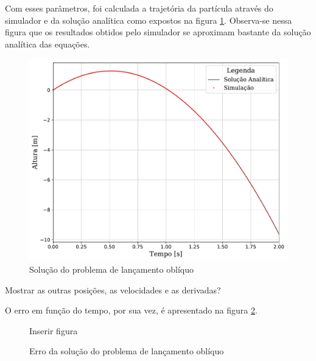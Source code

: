 Com esses parâmetros, foi calculada a trajetória da partícula através do simulador e da solução analítica como expostos na figura \ref{fig:falling_sphere}. Observa-se nessa figura que os resultados obtidos pelo simulador se aproximam bastante da solução analítica das equações.

\begin{figure}[h]
	\caption{Solução do problema de lançamento oblíquo}
	\begin{center}
		\includegraphics[width=\normalresultsfigwidth]{images/falling_sphere/y_position.pdf}
	\end{center}
	\label{fig:falling_sphere}
\end{figure}

\alert{Mostrar as outras posições, as velocidades e as derivadas?}

O erro em função do tempo, por sua vez, é apresentado na figura \ref{fig:falling_sphere_error}.

\begin{figure}[h]
	\caption{Erro da solução do problema de lançamento oblíquo}
	\begin{center}
		\alert{Inserir figura}
	\end{center}
	\label{fig:falling_sphere_error}
\end{figure}

